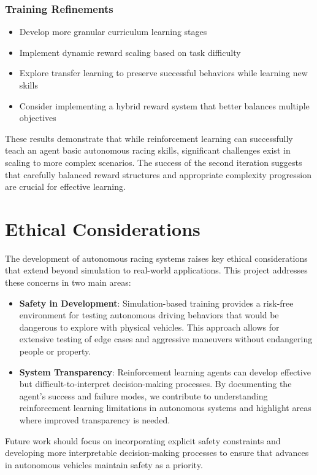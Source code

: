 \documentclass[10pt,twocolumn]{article}
\begin{document}
\subsubsection{Training Refinements}
\begin{itemize}
\item Develop more granular curriculum learning stages
\item Implement dynamic reward scaling based on task difficulty
\item Explore transfer learning to preserve successful behaviors while learning new skills
\item Consider implementing a hybrid reward system that better balances multiple objectives
\end{itemize}
These results demonstrate that while reinforcement learning can successfully teach an agent basic autonomous racing skills, significant challenges exist in scaling to more complex scenarios. The success of the second iteration suggests that carefully balanced reward structures and appropriate complexity progression are crucial for effective learning.

\section{Ethical Considerations}
The development of autonomous racing systems raises key ethical considerations that extend beyond simulation to real-world applications. This project addresses these concerns in two main areas:
\begin{itemize}
\item \textbf{Safety in Development}: Simulation-based training provides a risk-free environment for testing autonomous driving behaviors that would be dangerous to explore with physical vehicles. This approach allows for extensive testing of edge cases and aggressive maneuvers without endangering people or property.
\item \textbf{System Transparency}: Reinforcement learning agents can develop effective but difficult-to-interpret decision-making processes. By documenting the agent's success and failure modes\cite{AVPowerInequity}, we contribute to understanding reinforcement learning limitations in autonomous systems and highlight areas where improved transparency is needed.
\end{itemize}
Future work should focus on incorporating explicit safety constraints and developing more interpretable decision-making processes\cite{AlgorithmBiasInAutonomousSystems} to ensure that advances in autonomous vehicles maintain safety as a priority.
\end{document}
